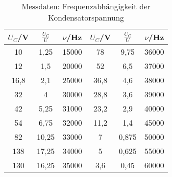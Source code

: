 
\begin{table}[h!]
  \centering
  \caption{Messdaten: Frequenzabhängigkeit der Kondensatorspannung}
  \label{tab:nukond}
  \begin{tabular}{c c c c c c}
    \toprule
$U_{C}$/V & $\frac{U_C}{U}$ & $\nu$/Hz   &  $U_{C}$/V & $\frac{U_C}{U}$ & $\nu$/Hz\\
    \midrule
  10		&  1,25	  & 15000   &    78		  &  9,75 	 & 36000  \\
  12		&  1,5	  & 20000   &    52		  &  6,5	   & 37000  \\
  16,8	&	 2,1	  & 25000   &    36,8	  &	 4,6	   & 38000  \\
  32		&  4	    & 30000   &    28,8	  &	 3,6	   & 39000  \\
  42		&  5,25 	& 31000   &    23,2	  &	 2,9	   & 40000  \\
  54		&  6,75 	& 32000   &    11,2	  &	 1,4	   & 45000  \\
  82		&  10,25	& 33000   &    7		  &  0,875	 & 50000  \\
  138		&  17,25	& 34000   &    5		  &  0,625	 & 55000  \\
  130		&  16,25	& 35000   &    3,6		&  0,45	   & 60000  \\
    \bottomrule
  \end{tabular}
\end{table}
